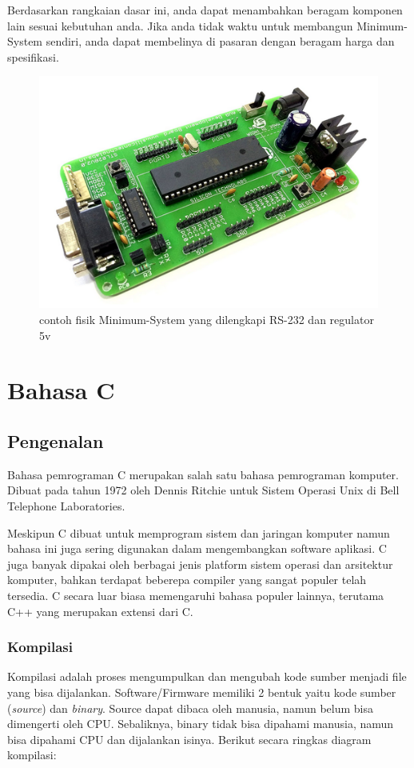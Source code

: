 \documentclass[12pt,]{article}
\begin{document}
	Berdasarkan rangkaian dasar ini, anda dapat menambahkan beragam komponen lain sesuai kebutuhan anda.
	Jika anda tidak waktu untuk membangun Minimum-System sendiri, anda dapat membelinya di pasaran dengan beragam harga dan spesifikasi.
	
	\begin{figure}[H]
		\centering
		\includegraphics[width=0.6\linewidth]{images/minsyshard}
		\caption{contoh fisik Minimum-System yang dilengkapi RS-232 dan regulator 5v}
	\end{figure}

	\newpage
	\section{Bahasa C}
	
	\subsection{Pengenalan}
	Bahasa pemrograman C merupakan salah satu bahasa pemrograman komputer. Dibuat pada tahun 1972 oleh Dennis Ritchie untuk Sistem Operasi Unix di Bell Telephone Laboratories.
	
	Meskipun C dibuat untuk memprogram sistem dan jaringan komputer namun bahasa ini juga sering digunakan dalam mengembangkan software aplikasi.
	C juga banyak dipakai oleh berbagai jenis platform sistem operasi dan arsitektur komputer, bahkan terdapat beberepa compiler yang sangat populer telah tersedia.
	C secara luar biasa memengaruhi bahasa populer lainnya, terutama C++ yang merupakan extensi dari C.
	
	\subsubsection{Kompilasi}
	Kompilasi adalah proses mengumpulkan dan mengubah kode sumber menjadi file yang bisa dijalankan.
	Software/Firmware memiliki 2 bentuk yaitu kode sumber (\textit{source}) dan \textit{binary}.
	Source dapat dibaca oleh manusia, namun belum bisa dimengerti oleh CPU.
	Sebaliknya, binary tidak bisa dipahami manusia, namun bisa dipahami CPU dan dijalankan isinya. 
	Berikut secara ringkas diagram kompilasi:
	
\end{document}
